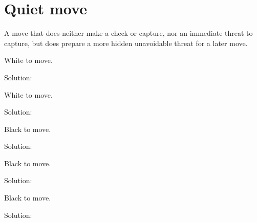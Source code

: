 \documentclass{book}
\begin{document}
\section{Quiet move}
A move that does neither make a check or capture, nor an immediate threat to capture, but does prepare a more hidden unavoidable threat for a later move.\begin{multicols}{2} 
\begin{samepage} 
\newgame 


 
\showboard
 
 White to move. 
 
Solution: 
 
\end{samepage}\begin{samepage} 
\newgame 


 
\showboard
 
 White to move. 
 
Solution: 
 
\end{samepage}\begin{samepage} 
\newgame 


 
\showboard
 
 Black to move. 
 
Solution: 
 
\end{samepage}\begin{samepage} 
\newgame 


 
\showboard
 
 Black to move. 
 
Solution: 
 
\end{samepage}\begin{samepage} 
\newgame 


 
\showboard
 
 Black to move. 
 
Solution: 
 

\end{samepage}
\end{multicols}
\end{document}

